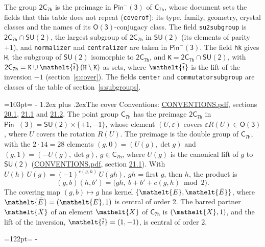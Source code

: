 \documentclass[10pt,a4paper]{article}
\makeatletter
\renewcommand\section{\@startsection{section}{1}{\z@}{-3ex plus -1ex minus -.2ex}%
  {1.2ex plus .2ex}{\normalfont\large\sffamily\bfseries\color{parttitle}}}
\newcommand{\needspace}[1]{\par\penalty-100\begingroup\dimen0=#1\relax\dimen2=\pagegoal
  \advance\dimen2-\pagetotal\ifdim\dimen0>\dimen2\relax\ifdim\dimen2>0pt\vfil\break\fi\fi
  \endgroup}
\numberwithin{equation}{section}
\newcommand{\eltfont}[1]{{\let\sigma\eltsigma\mathelt{#1}}}
\newcommand{\grp}[1]{\mathsf{#1}}
\newcommand{\elt}[1]{\eltfont{#1}}
\newcommand{\dirprod}{\times}
\newcommand{\barred}[1]{\bar{#1}}
\newcommand{\lift}[1]{\tilde{#1}}
\makeatother
\begin{document}
\leavevmode\label{n:element.inversion}\label{n:group.preimage}The group $\grp{2C_{7h}}$ is the preimage in $\grp{Pin^{-}(3)}$ of \href{../../../rotation/data/pdf/C7h.pdf}{$\grp{C_{7h}}$}, whose document sets the fields that this table does not repeat (\texttt{coverof}): its type, family, geometry, crystal classes and the names of its \href{../../../rotation/data/pdf/O3.pdf}{$\grp{O(3)}$}-conjugacy class. The field \texttt{su2subgroup} is $\grp{2C_{7h}} \cap \grp{SU(2)}$, the largest subgroup of $\grp{2C_{7h}}$ in $\grp{SU(2)}$ (its elements of parity $+1$), and \texttt{normalizer} and \texttt{centralizer} are taken in $\grp{Pin^{-}(3)}$. The field \texttt{hk} gives \texttt{H}, the subgroup of $\grp{SU(2)}$ isomorphic to $\grp{2C_{7h}}$, and \texttt{K}${} = \grp{2C_{7h}} \cap \grp{SU(2)}$, with $\grp{2C_{7h}} = \texttt{K} \cup \elt{\lift{i}}\,(\texttt{H} \setminus \texttt{K})$ as sets, where $\elt{\lift{i}}$ is the lift of the inversion $-1$ (section~\ref{s:cover}). The fields \texttt{center} and \texttt{commutatorsubgroup} are classes of the table of section~\ref{s:subgroups}.
\needspace{103pt}
\section{The cover}\label{s:cover}
Conventions: \href{../../CONVENTIONS.pdf}{CONVENTIONS.pdf}, sections \href{../../CONVENTIONS.pdf\#conv.20.1}{20.1}, \href{../../CONVENTIONS.pdf\#conv.21.1}{21.1} and \href{../../CONVENTIONS.pdf\#conv.21.2}{21.2}.
\leavevmode\label{n:group.pin.minus}\label{n:group.su2}\label{n:local.pin.sign}\label{n:matrix.covered}\label{n:matrix.lift.su2}\label{n:index.bar}The point group $\grp{C_{7h}}$ has the preimage $\grp{2C_{7h}}$ in $\grp{Pin^{-}(3)} = \grp{SU(2)} \dirprod \{+1, -1\}$, whose element $(U, \varepsilon)$ covers $\varepsilon R(U) \in \grp{O(3)}$, where $U$ covers the rotation $R(U)$. The preimage is the double group of $\grp{C_{7h}}$, with the $2 \cdot 14 = 28$ elements $(g, 0) = (U(g), \det g)$ and $(g, 1) = (-U(g), \det g)$, $g \in \grp{C_{7h}}$, where $U(g)$ is the canonical lift of $g$ to $\grp{SU(2)}$ (\href{../../CONVENTIONS.pdf}{CONVENTIONS.pdf}, section \href{../../CONVENTIONS.pdf\#conv.21.1}{21.1}). \label{n:function.cocycle}With $U(h)\,U(g) = (-1)^{c(g,h)}\,U(gh)$, $gh$ = first $g$, then $h$, the product is
\begin{equation}\label{e:product}(g, b)(h, b') = \bigl(gh,\ b + b' + c(g, h) \bmod 2\bigr).\end{equation}
\leavevmode\label{n:mark.bar}The covering map $(g, b) \mapsto g$ has kernel $\{\elt{E}, \elt{\barred{E}}\}$, where $\elt{\barred{E}} = (\elt{E}, 1)$ is central of order 2. \label{n:element.named}\label{n:mark.lift}The barred partner $\elt{\barred{X}}$ of an element $\elt{X}$ of $\grp{C_{7h}}$ is $(\elt{X}, 1)$, and the lift of the inversion, $\elt{\lift{i}} = (1, -1)$, is central of order 2.
\needspace{122pt}
\end{document}
